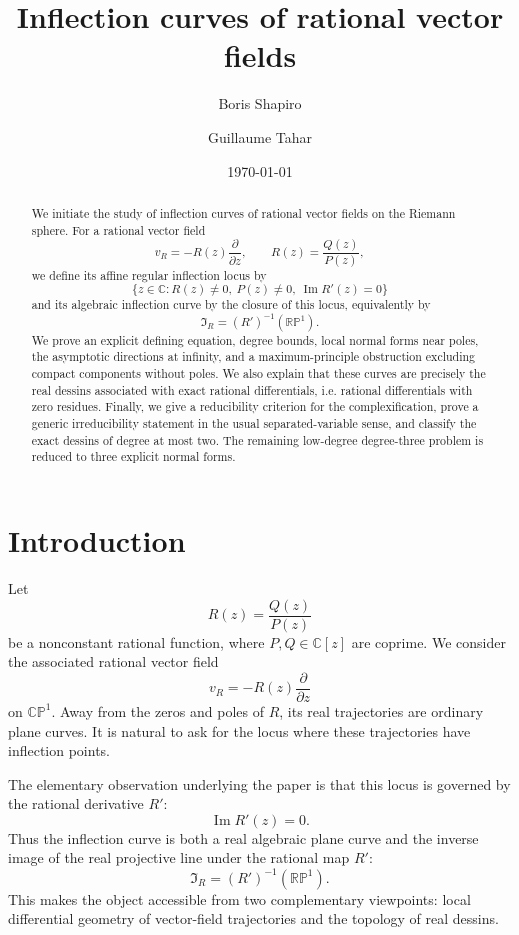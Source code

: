\documentclass[11pt,reqno]{amsart}
\title[Inflection curves of rational vector fields]{Inflection curves of rational vector fields}
\author[B. Shapiro]{Boris Shapiro}
\author[G. Tahar]{Guillaume Tahar}
\date{\today}
\theoremstyle{definition}
\theoremstyle{remark}
\newcommand{\C}{\mathbb C}
\newcommand{\CP}{\mathbb {CP}}
\newcommand{\RP}{\mathbb {RP}}
\newcommand{\I}{\mathfrak I}
\renewcommand{\Im}{\operatorname{Im}}
\begin{document}
\begin{abstract}
We initiate the study of inflection curves of rational vector fields on the Riemann sphere.  For a rational vector field
\[
        v_R=-R(z)\frac{\partial}{\partial z},
        \qquad R(z)=\frac{Q(z)}{P(z)},
\]
we define its affine regular inflection locus by
\[
        \{z\in \C: R(z)\ne0,\ P(z)\ne0,\ \Im R'(z)=0\}
\]
and its algebraic inflection curve by the closure of this locus, equivalently by
\[
        \I_R=(R')^{-1}(\RP^1).
\]
We prove an explicit defining equation, degree bounds, local normal forms near poles, the asymptotic directions at infinity, and a maximum-principle obstruction excluding compact components without poles.  We also explain that these curves are precisely the real dessins associated with exact rational differentials, i.e. rational differentials with zero residues.  Finally, we give a reducibility criterion for the complexification, prove a generic irreducibility statement in the usual separated-variable sense, and classify the exact dessins of degree at most two.  The remaining low-degree degree-three problem is reduced to three explicit normal forms.
\end{abstract}

\maketitle

\section{Introduction}

Let
\[
        R(z)=\frac{Q(z)}{P(z)}
\]
be a nonconstant rational function, where $P,Q\in\C[z]$ are coprime.  We consider the associated rational vector field
\[
        v_R=-R(z)\frac{\partial}{\partial z}
\]
on $\CP^1$.  Away from the zeros and poles of $R$, its real trajectories are ordinary plane curves.  It is natural to ask for the locus where these trajectories have inflection points.

The elementary observation underlying the paper is that this locus is governed by the rational derivative $R'$:
\[
        \Im R'(z)=0.
\]
Thus the inflection curve is both a real algebraic plane curve and the inverse image of the real projective line under the rational map $R'$:
\[
        \I_R=(R')^{-1}(\RP^1).
\]
This makes the object accessible from two complementary viewpoints: local differential geometry of vector-field trajectories and the topology of real dessins.
\end{document}
